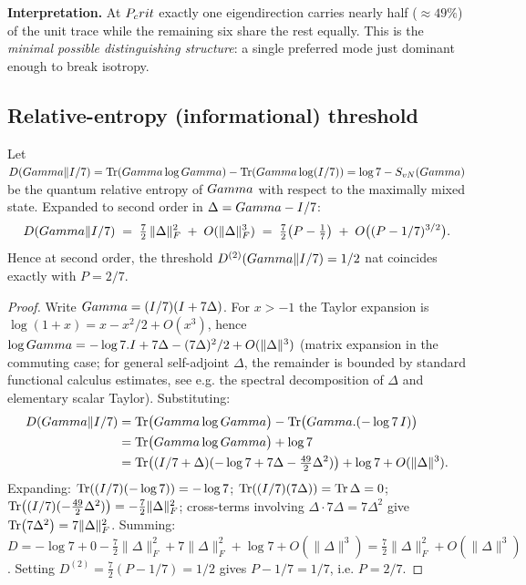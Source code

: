 \textbf{Interpretation.} At $P_crit$ exactly one eigendirection carries nearly half
($\approx 49\%$) of the unit trace while the remaining six share the rest
equally. This is the \emph{minimal possible distinguishing structure}:
a single preferred mode just dominant enough to break isotropy.

\subsection{Relative-entropy (informational) threshold}
\label{app:pcrit-kl}

\begin{theorembox}
Let $D(Gamma \| I/7) = \Tr(Gamma \log Gamma) - \Tr(Gamma\log(I/7))
= \log 7 - S_{vN}(Gamma)$ be the quantum relative entropy of
$Gamma$ with respect to the maximally mixed state.
Expanded to second order in $\Delta = Gamma - I/7$:
\[
  D(Gamma \| I/7) \;=\; \tfrac{7}{2}\,\|\Delta\|_F^2 \;+\; O(\|\Delta\|_F^3)
  \;=\; \tfrac{7}{2}\bigl(P - \tfrac{1}{7}\bigr) \;+\; O\bigl((P-1/7)^{3/2}\bigr).
\]
Hence at second order, the threshold $D^{(2)}(Gamma\|I/7) = 1/2$ nat
coincides exactly with $P = 2/7$.
\end{theorembox}

\begin{proof}
Write $Gamma = (I/7)(I + 7\Delta)$. For $x > -1$ the Taylor expansion is
$\log(1+x) = x - x^2/2 + O(x^3)$, hence
$\log Gamma = -\log 7. I + 7\Delta - (7\Delta)^2/2 + O(\|\Delta\|^3)$
(matrix expansion in the commuting case; for general self-adjoint $\Delta$,
the remainder is bounded by standard functional calculus estimates,
see e.g. the spectral decomposition of $\Delta$ and elementary scalar Taylor).
Substituting:
\begin{align*}
  D(Gamma \| I/7)
  &= \Tr\bigl(Gamma\log Gamma\bigr) - \Tr\bigl(Gamma .(-\log 7\,I)\bigr) \\
  &= \Tr\bigl(Gamma\log Gamma\bigr) + \log 7 \\
  &= \Tr\bigl((I/7 + \Delta)(-\log 7 + 7\Delta - \tfrac{49}{2}\Delta^2)\bigr) + \log 7 + O(\|\Delta\|^3).
\end{align*}
Expanding: $\Tr((I/7)(-\log 7)) = -\log 7$; $\Tr((I/7)(7\Delta)) = \Tr\Delta = 0$;
$\Tr((I/7)(-\tfrac{49}{2}\Delta^2)) = -\tfrac{7}{2}\|\Delta\|_F^2$; cross-terms involving
$\Delta\cdot 7\Delta = 7\Delta^2$ give $\Tr(7\Delta^2) = 7\|\Delta\|_F^2$.
Summing:
$D = -\log 7 + 0 - \tfrac{7}{2}\|\Delta\|_F^2 + 7\|\Delta\|_F^2 + \log 7 + O(\|\Delta\|^3)
= \tfrac{7}{2}\|\Delta\|_F^2 + O(\|\Delta\|^3)$.
Setting $D^{(2)} = \tfrac{7}{2}(P - 1/7) = 1/2$ gives $P - 1/7 = 1/7$, i.e. $P = 2/7$.
\end{proof}

